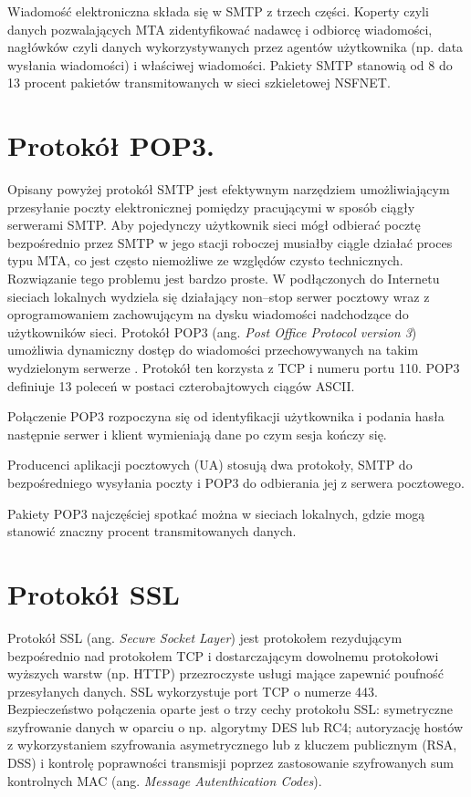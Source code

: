 Wiadomość elektroniczna składa się w SMTP z trzech części. Koperty czyli danych pozwalających MTA zidentyfikować 
nadawcę i odbiorcę wiadomości, nagłówków czyli danych wykorzystywanych przez agentów użytkownika (np. data 
wysłania wiadomości) i właściwej wiadomości.
Pakiety SMTP stanowią od 8 do 13 procent pakietów transmitowanych w sieci szkieletowej NSFNET. 

\section{Protokół POP3.}

Opisany powyżej protokół SMTP jest efektywnym narzędziem umożliwiającym przesyłanie poczty elektronicznej 
pomiędzy pracującymi w sposób ciągły serwerami SMTP. Aby pojedynczy użytkownik sieci mógł odbierać pocztę 
bezpośrednio przez SMTP w jego stacji roboczej musiałby ciągle działać proces typu MTA, co jest często 
niemożliwe ze względów czysto technicznych. Rozwiązanie tego problemu jest bardzo proste. W podłączonych do 
Internetu sieciach lokalnych wydziela się działający non--stop  serwer pocztowy wraz z oprogramowaniem 
zachowującym na dysku wiadomości nadchodzące do użytkowników sieci. Protokół POP3 (ang. \emph{Post Office Protocol 
version 3}) umożliwia dynamiczny dostęp do wiadomości przechowywanych na takim wydzielonym serwerze \cite{barylo9}. Protokół ten 
korzysta z TCP i numeru portu 110. POP3 definiuje 13 poleceń w postaci czterobajtowych ciągów ASCII. 

Połączenie POP3 rozpoczyna się od identyfikacji użytkownika i podania hasła następnie serwer i klient wymieniają 
dane po czym sesja kończy się.

Producenci aplikacji pocztowych (UA) stosują dwa protokoły, SMTP do bezpośredniego wysyłania poczty i POP3 
do odbierania jej z serwera pocztowego.

Pakiety POP3 najczęściej spotkać można w sieciach lokalnych, gdzie mogą stanowić znaczny procent 
transmitowanych danych.

\section{Protokół SSL}

Protokół SSL (ang. \emph{Secure Socket Layer}) jest protokołem rezydującym bezpośrednio nad protokołem TCP i 
dostarczającym dowolnemu protokołowi wyższych warstw (np. HTTP) przezroczyste usługi mające zapewnić poufność 
przesyłanych danych. SSL wykorzystuje port TCP o numerze 443. Bezpieczeństwo połączenia oparte jest o trzy cechy 
protokołu SSL: symetryczne szyfrowanie danych w oparciu o np. algorytmy DES lub RC4; autoryzację hostów z 
wykorzystaniem szyfrowania asymetrycznego lub z kluczem publicznym (RSA, DSS) i  kontrolę poprawności transmisji 
poprzez zastosowanie szyfrowanych sum kontrolnych MAC (ang. \emph{Message Autenthication Codes}).

